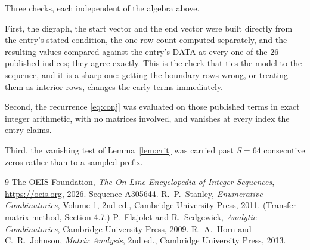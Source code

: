 \documentclass[11pt,a4paper]{article}
\theoremstyle{plain}
\theoremstyle{definition}
\begin{document}
Three checks, each independent of the algebra above.

First, the digraph, the start vector and the end vector were built directly from the
entry's stated condition, the one-row count computed separately, and the resulting values
compared against the entry's DATA at every one of the $26$ published indices; they
agree exactly. This is the check that ties the model to the sequence, and it is a sharp one:
getting the boundary rows wrong, or treating them as interior rows, changes the early terms
immediately.

Second, the recurrence \eqref{eq:conj} was evaluated on those published terms in exact
integer arithmetic, with no matrices involved, and vanishes at every index the entry claims.

Third, the vanishing test of Lemma~\ref{lem:crit} was carried past $S=64$ consecutive
zeros rather than to a sampled prefix.

\begin{thebibliography}{9}
 The OEIS Foundation, \emph{The On-Line Encyclopedia of Integer
Sequences}, \url{https://oeis.org}, 2026. Sequence A305644.
 R.~P.~Stanley, \emph{Enumerative Combinatorics}, Volume 1, 2nd ed.,
Cambridge University Press, 2011. (Transfer-matrix method, Section 4.7.)
 P.~Flajolet and R.~Sedgewick, \emph{Analytic Combinatorics}, Cambridge
University Press, 2009.
 R.~A.~Horn and C.~R.~Johnson, \emph{Matrix Analysis}, 2nd ed., Cambridge
University Press, 2013.
\end{thebibliography}
\end{document}
